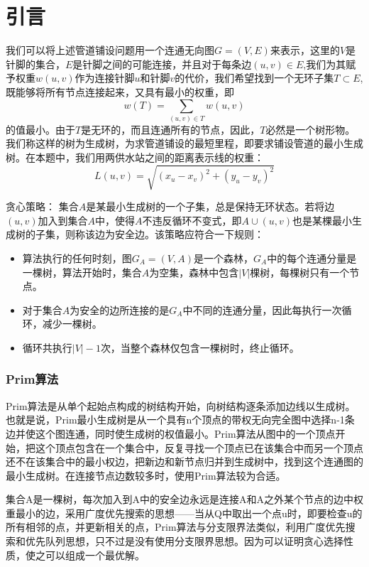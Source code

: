 \documentclass{cumcmthesis}
\begin{document}
\tableofcontents


\section{引言}

我们可以将上述管道铺设问题用一个连通无向图$G=(V,E)$来表示，这里的$V$是针脚的集合，$E$是针脚之间的可能连接，并且对于每条边$(u,v)\in E$,我们为其赋予权重$w(u,v)$作为连接针脚$u$和针脚$v$的代价，我们希望找到一个无环子集$T\subset E$,既能够将所有节点连接起来，又具有最小的权重，即
$$w(T)=\sum\limits_{(u,v)\in T}{w(u,v)}$$
的值最小。由于$T$是无环的，而且连通所有的节点，因此，$T$必然是一个树形物。我们称这样的树为生成树，为求管道铺设的最短里程，即要求铺设管道的最小生成树。在本题中，我们用两供水站之间的距离表示线的权重：
$$L(u,v)=\sqrt{(x_{u}-x_{v})^{2}+(y_{u}-y_{v})^{2}}$$

贪心策略：
集合$A$是某最小生成树的一个子集，总是保持无环状态。若将边$(u,v)$加入到集合$A$中，使得$A$不违反循环不变式，即$A\cup{(u,v)}$也是某棵最小生成树的子集，则称该边为安全边。该策略应符合一下规则：
\begin{itemize}
  \item 算法执行的任何时刻，图$G_{A}=(V,A)$是一个森林，$G_{A}$中的每个连通分量是一棵树，算法开始时，集合$A$为空集，森林中包含$|V|$棵树，每棵树只有一个节点。
  \item 对于集合$A$为安全的边所连接的是$G_{A}$中不同的连通分量，因此每执行一次循环，减少一棵树。
  \item 循环共执行$|V|-1$次，当整个森林仅包含一棵树时，终止循环。
\end{itemize}

\subsubsection{Prim算法}
  Prim算法是从单个起始点构成的树结构开始，向树结构逐条添加边线以生成树。也就是说，Prim最小生成树是从一个具有n个顶点的带权无向完全图中选择n-1条边并使这个图连通，同时使生成树的权值最小。Prim算法从图中的一个顶点开始，把这个顶点包含在一个集合中，反复寻找一个顶点已在该集合中而另一个顶点还不在该集合中的最小权边，把新边和新节点归并到生成树中，找到这个连通图的最小生成树。在连接节点边数较多时，使用Prim算法较为合适。

  集合A是一棵树，每次加入到A中的安全边永远是连接A和A之外某个节点的边中权重最小的边，采用广度优先搜索的思想——当从Q中取出一个点u时，即要检查u的所有相邻的点，并更新相关的点，Prim算法与分支限界法类似，利用广度优先搜索和优先队列思想，只不过是没有使用分支限界思想。因为可以证明贪心选择性质，使之可以组成一个最优解。
  
\end{document}
